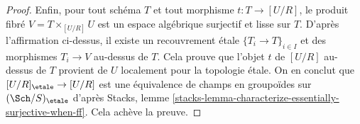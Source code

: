\begin{proof}
\medskip\noindent
Enfin, pour tout schéma $T$ et tout morphisme $t : T \to [U/R]$, le produit fibré
$V = T \times_{[U/R]} U$ est un espace algébrique surjectif et lisse sur $T$.
D'après l'affirmation ci-dessus, il existe un recouvrement étale $\{T_i \to T\}_{i \in I}$
et des morphismes $T_i \to V$ au-dessus de $T$. Cela prouve que l'objet
$t$ de $[U/R]$ au-dessus de $T$ provient de $U$ localement pour la topologie étale. On en conclut que
$[U/R]_\etale \to [U/R]$ est une équivalence de champs en
groupoïdes sur $(\Sch/S)_\etale$ d'après
Stacks, lemme \ref{stacks-lemma-characterize-essentially-surjective-when-ff}.
Cela achève la preuve.
\end{proof}
















